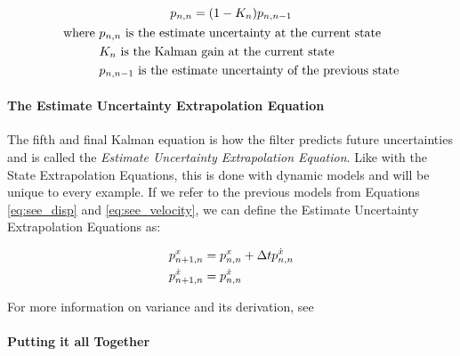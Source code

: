         \begin{gather}
            p_{n,n} = (1-K_n)p_{n,n-1} \\
            \begin{aligned}
                \text{where } &p_{n,n} \text{ is the estimate uncertainty at the current state} \\
                              &K_n \text{ is the Kalman gain at the current state} \\
                              &p_{n,n-1} \text{ is the estimate uncertainty of the previous state}
            \end{aligned} \notag
        \end{gather}

        \paragraph*{The Estimate Uncertainty Extrapolation Equation} The fifth and final Kalman equation is how the filter predicts future uncertainties and is called the \textit{Estimate Uncertainty Extrapolation Equation}. 
        Like with the State Extrapolation Equations, this is done with dynamic models and will be unique to every example.
        If we refer to the previous models from Equations \ref{eq:see_disp} and \ref{eq:see_velocity}, we can define the Estimate Uncertainty Extrapolation Equations as:

        \begin{subequations}
            \labeq{covariance_extrapolation}
            \begin{align}
                p_{n+1,n}^x &= p_{n,n}^x + \Delta t p_{n,n}^{\dot{x}} \\
                p_{n+1,n}^{\dot{x}} &= p_{n,n}^{\dot{x}}
            \end{align}
        \end{subequations}

        For more information on variance and its derivation, see 

        \paragraph*{Putting it all Together}



